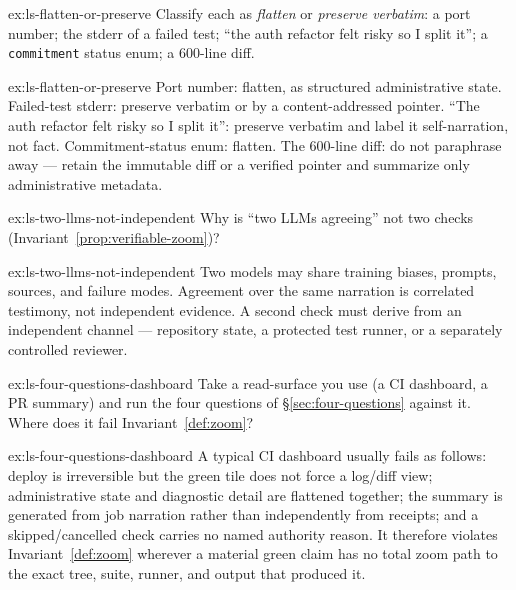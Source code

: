 \documentclass[11pt,a4paper]{article}
\theoremstyle{definition}
\theoremstyle{plain}
\begin{document}
\begin{pdexercise}[kind=Check,rating=1]{ex:ls-flatten-or-preserve}
Classify each as \emph{flatten} or \emph{preserve verbatim}: a port number;
the stderr of a failed test; ``the auth refactor felt risky so I split it''; a
\texttt{commitment} status enum; a 600-line diff.
\end{pdexercise}
\begin{pdsolution}{ex:ls-flatten-or-preserve}
Port number: flatten, as structured administrative state. Failed-test stderr: preserve verbatim or by a content-addressed pointer. ``The auth refactor felt risky so I split it'': preserve verbatim and label it self-narration, not fact. Commitment-status enum: flatten. The 600-line diff: do not paraphrase away --- retain the immutable diff or a verified pointer and summarize only administrative metadata.
\end{pdsolution}
\begin{pdexercise}[kind=Check,rating=1]{ex:ls-two-llms-not-independent}
Why is ``two LLMs agreeing''
not two checks (Invariant~\ref{prop:verifiable-zoom})?
\end{pdexercise}
\begin{pdsolution}{ex:ls-two-llms-not-independent}
Two models may share training biases, prompts, sources, and failure modes. Agreement over the same narration is correlated testimony, not independent evidence. A second check must derive from an independent channel --- repository state, a protected test runner, or a separately controlled reviewer.
\end{pdsolution}
\begin{pdexercise}[kind=Trace,rating=2]{ex:ls-four-questions-dashboard}
Take a read-surface you use (a CI dashboard, a PR summary) and run the four
questions of \S\ref{sec:four-questions} against it. Where does it fail Invariant~\ref{def:zoom}?
\end{pdexercise}
\begin{pdsolution}{ex:ls-four-questions-dashboard}
A typical CI dashboard usually fails as follows: deploy is irreversible but the green tile does not force a log/diff view; administrative state and diagnostic detail are flattened together; the summary is generated from job narration rather than independently from receipts; and a skipped/cancelled check carries no named authority reason. It therefore violates Invariant~\ref{def:zoom} wherever a material green claim has no total zoom path to the exact tree, suite, runner, and output that produced it.
\end{pdsolution}
\end{document}
